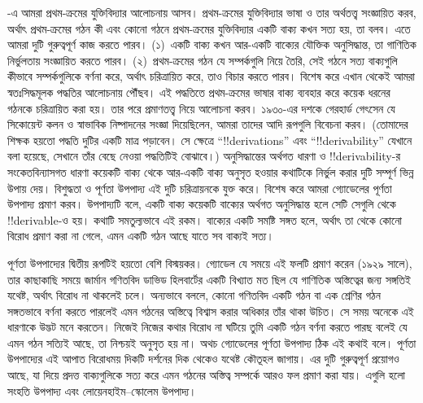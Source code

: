 -এ আমরা প্রথম-ক্রমের যুক্তিবিদ্যার আলোচনায় আসব।
প্রথম-ক্রমের যুক্তিবিদ্যার ভাষা ও তার অর্থতত্ত্ব সংজ্ঞায়িত করব,
অর্থাৎ প্রথম-ক্রমের গঠন কী এবং কোনো গঠনে প্রথম-ক্রমের যুক্তিবিদ্যার
একটি বাক্য কখন সত্য হয়, তা বলব। এতে আমরা দুটি গুরুত্বপূর্ণ কাজ
করতে পারব। (১)~একটি বাক্য কখন আর-একটি বাক্যের যৌক্তিক অনুসিদ্ধান্ত,
তা গাণিতিক নির্ভুলতায় সংজ্ঞায়িত করতে পারব। (২)~প্রথম-ক্রমের
গঠন যে সম্পর্কগুলি নিয়ে তৈরি, সেই গঠনে সত্য বাক্যগুলি কীভাবে
সম্পর্কগুলিকে বর্ণনা করে, অর্থাৎ চরিত্রায়িত করে, তাও বিচার করতে
পারব। বিশেষ করে এখান থেকেই আমরা স্বতঃসিদ্ধমূলক পদ্ধতির আলোচনায়
পৌঁছব। এই পদ্ধতিতে প্রথম-ক্রমের ভাষার বাক্য ব্যবহার করে কয়েক ধরনের
গঠনকে চরিত্রায়িত করা হয়। তার পরে প্রমাণতত্ত্ব নিয়ে আলোচনা করব।
১৯৩০-এর দশকে গেরহার্ড গেৎসেন যে সিকোয়েন্ট কলন ও স্বাভাবিক
নিষ্পাদনের সংজ্ঞা দিয়েছিলেন, আমরা তাদের আদি রূপগুলি বিবেচনা করব।
(তোমাদের শিক্ষক হয়তো পদ্ধতি দুটির একটি মাত্র পড়াবেন। সে ক্ষেত্রে
``!!{derivation}s'' এবং ``!!{derivability}'' যেখানে বলা হয়েছে,
সেখানে তাঁর বেছে নেওয়া পদ্ধতিটিই বোঝাবে।) অনুসিদ্ধান্তের অর্থগত
ধারণা ও !!{derivability}-র সংকেতবিন্যাসগত ধারণা কয়েকটি বাক্য
থেকে আর-একটি বাক্য অনুসৃত হওয়ার কথাটিকে নির্ভুল করার দুটি
সম্পূর্ণ ভিন্ন উপায় দেয়। বিশুদ্ধতা ও পূর্ণতা উপপাদ্য এই দুটি
চরিত্রায়নকে যুক্ত করে। বিশেষ করে আমরা গ্যোডেলের পূর্ণতা উপপাদ্য
প্রমাণ করব। উপপাদ্যটি বলে, একটি বাক্য কয়েকটি বাক্যের অর্থগত
অনুসিদ্ধান্ত হলে সেটি সেগুলি থেকে !!{derivable}-ও হয়। কথাটি
সমতুল্যভাবে এই রকম। বাক্যের একটি সমষ্টি সঙ্গত হলে, অর্থাৎ তা থেকে
কোনো বিরোধ প্রমাণ করা না গেলে, এমন একটি গঠন আছে যাতে সব
বাক্যই সত্য।

পূর্ণতা উপপাদ্যের দ্বিতীয় রূপটিই হয়তো বেশি বিস্ময়কর। গ্যোডেল
যে সময়ে এই ফলটি প্রমাণ করেন (১৯২৯ সালে), তার কাছাকাছি সময়ে
জার্মান গণিতবিদ ডাভিড হিলবার্টের একটি বিখ্যাত মত ছিল যে গাণিতিক
অস্তিত্বের জন্য সঙ্গতিই যথেষ্ট, অর্থাৎ বিরোধ না থাকলেই চলে।
অন্যভাবে বললে, কোনো গণিতবিদ একটি গঠন বা এক শ্রেণির গঠন সঙ্গতভাবে
বর্ণনা করতে পারলেই এমন গঠনের অস্তিত্বে বিশ্বাস করার অধিকার তাঁর
থাকা উচিত। সে সময় অনেকে এই ধারণাকে উদ্ভট মনে করতেন। নিজেই
নিজের কথার বিরোধ না ঘটিয়ে তুমি একটি গঠন বর্ণনা করতে পারছ বলেই
যে এমন গঠন সত্যিই আছে, তা নিশ্চয়ই অনুসৃত হয় না। অথচ গ্যোডেলের
পূর্ণতা উপপাদ্য ঠিক এই কথাই বলে। পূর্ণতা উপপাদ্যের এই আপাত
বিরোধময় দিকটি দর্শনের দিক থেকেও যথেষ্ট কৌতূহল জাগায়। এর দুটি
গুরুত্বপূর্ণ প্রয়োগও আছে, যা দিয়ে প্রদত্ত বাক্যগুলিকে সত্য করে
এমন গঠনের অস্তিত্ব সম্পর্কে আরও ফল প্রমাণ করা যায়। এগুলি হলো
সংহতি উপপাদ্য এবং লোয়েনহাইম--স্কোলেম উপপাদ্য।

